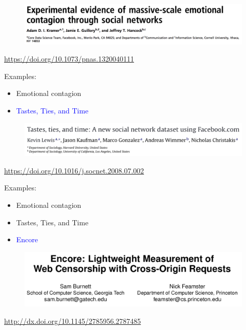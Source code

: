 \documentclass{beamer}
\begin{document}
\begin{frame}

\begin{figure}
\includegraphics{figures/kramer_experimental_2014_title}
\end{figure}

\vfill
\url{https://doi.org/10.1073/pnas.1320040111}
\end{frame}
\begin{frame}

Examples:
\begin{itemize}
\item Emotional contagion
\item \textcolor{blue}{Tastes, Ties, and Time}
\end{itemize}

\end{frame}
\begin{frame}

\begin{figure}
\includegraphics{figures/lewis_tastes_2008_title}
\end{figure}

\vfill
\url{https://doi.org/10.1016/j.socnet.2008.07.002}

\end{frame}
\begin{frame}

Examples:
\begin{itemize}
\item Emotional contagion
\item Tastes, Ties, and Time
\item \textcolor{blue}{Encore}
\end{itemize}

\end{frame}
\begin{frame}

\begin{figure}
\includegraphics{figures/burnett_encore_2015_title}
\end{figure}

\vfill
\url{http://dx.doi.org/10.1145/2785956.2787485}

\end{frame}
\end{document}
